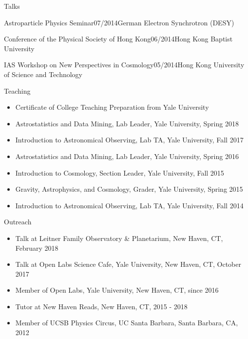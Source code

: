 \documentclass[11pt]{resume} %
\begin{document}
\begin{rSection}{Talks}
\begin{adjustwidth}{0.5cm}{}
    \begin{rSubsection}{Astroparticle Physics Seminar}{07/2014}{German Electron Synchrotron (DESY)}{}\end{rSubsection}

    \begin{rSubsection}{Conference of the Physical Society of Hong Kong}{06/2014}{Hong Kong Baptist University}{}\end{rSubsection}

    \begin{rSubsection}{IAS Workshop on New Perspectives in Cosmology}{05/2014}{Hong Kong University of Science and Technology}{}\end{rSubsection}
  \end{adjustwidth}
\end{rSection}


\begin{rSection}{Teaching}
  \begin{itemize}[leftmargin=1.0cm, topsep=0pt,itemsep=0pt,partopsep=0pt, parsep=0pt]
    \item Certificate of College Teaching Preparation from Yale University
    \item Astrostatistics and Data Mining, Lab Leader, Yale University, Spring 2018
    \item Introduction to Astronomical Observing, Lab TA, Yale University, Fall 2017
    \item Astrostatistics and Data Mining, Lab Leader, Yale University, Spring 2016
    \item Introduction to Cosmology, Section Leader, Yale University, Fall 2015
    \item Gravity, Astrophysics, and Cosmology, Grader, Yale University, Spring 2015
    \item Introduction to Astronomical Observing, Lab TA, Yale University, Fall 2014
  \end{itemize}
\end{rSection}

\begin{rSection}{Outreach}
  \begin{itemize}[leftmargin=1.0cm, topsep=0pt,itemsep=0pt,partopsep=0pt, parsep=0pt]
    \item Talk at Leitner Family Observatory \& Planetarium, New Haven, CT, February 2018
    \item Talk at Open Labs Science Cafe, Yale University, New Haven, CT, October 2017
    \item Member of Open Labs, Yale University, New Haven, CT, since 2016
    \item Tutor at New Haven Reads, New Haven, CT, 2015 - 2018
    \item Member of UCSB Physics Circus, UC Santa Barbara, Santa Barbara, CA, 2012
  \end{itemize}
\end{rSection}
\end{document}
